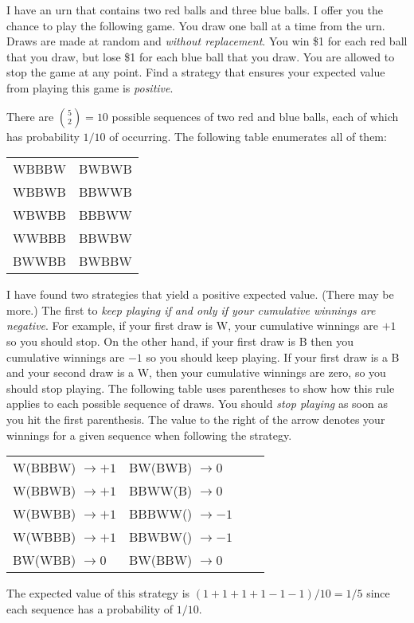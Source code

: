 \documentclass[addpoints,12pt]{exam}
\begin{document}
\begin{questions}
  \question I have an urn that contains two red balls and three blue balls.
  I offer you the chance to play the following game. You draw one ball at a time from the urn. Draws are made at random and \emph{without replacement}. You win \$1 for each red ball that you draw, but lose \$1 for each blue ball that you draw. You are allowed to stop the game at any point. Find a strategy that ensures your expected value from playing this game is \emph{positive}. 
  \begin{solution}
    There are ${5 \choose 2} = 10$ possible sequences of two red and blue balls, each of which has probability $1/10$ of occurring. 
    The following table enumerates all of them:
    \begin{center}
    \begin{tabular}[h]{ll}
      WBBBW & BWBWB\\
      WBBWB & BBWWB\\
      WBWBB & BBBWW\\
      WWBBB & BBWBW\\
      BWWBB & BWBBW
    \end{tabular}
  \end{center}
  I have found two strategies that yield a positive expected value.
  (There may be more.)
  The first to \emph{keep playing if and only if your cumulative winnings are negative}.
  For example, if your first draw is W, your cumulative winnings are $+1$ so you should stop.
  On the other hand, if your first draw is B then you cumulative winnings are $-1$ so you should keep playing. 
  If your first draw is a B and your second draw is a W, then your cumulative winnings are zero, so you should stop playing.
  The following table uses parentheses to show how this rule applies to each possible sequence of draws.
  You should \emph{stop playing} as soon as you hit the first parenthesis.
  The value to the right of the arrow denotes your winnings for a given sequence when following the strategy.
  \begin{center}
    \begin{tabular}[h]{llll}
      W(BBBW) $\rightarrow +1$& BW(BWB) $\rightarrow 0$\\
      W(BBWB) $\rightarrow +1$& BBWW(B) $\rightarrow 0$\\
      W(BWBB) $\rightarrow +1$& BBBWW() $\rightarrow -1$\\
      W(WBBB) $\rightarrow +1$& BBWBW() $\rightarrow -1$\\
      BW(WBB) $\rightarrow 0$& BW(BBW) $\rightarrow 0$
    \end{tabular}
  \end{center}
  The expected value of this strategy is $(1 + 1 + 1 + 1 - 1 - 1)/10 = 1/5$ since each sequence has a probability of $1/10$.


\end{solution}
\end{questions}
\end{document}
